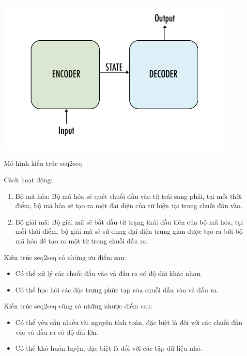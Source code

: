 \begin{minipage}{\linewidth}
    \captionsetup{type=figure}
    \centering
    \includegraphics[width=0.9\textwidth]{images/seq2seq.png}
    \caption{Mô hình kiến trúc seq2seq}
\end{minipage}\par\vfill

Cách hoạt động:

\begin{enumerate}
    \item Bộ mã hóa: Bộ mã hóa sẽ quét chuỗi đầu vào từ trái sang phải, tại mỗi thời điểm, bộ mã hóa sẽ tạo ra một đại diện của từ hiện tại trong chuỗi đầu vào.
    \item Bộ giải mã: Bộ giải mã sẽ bắt đầu từ trạng thái đầu tiên của bộ mã hóa, tại mỗi thời điểm, bộ giải mã sẽ sử dụng đại diện trung gian được tạo ra bởi bộ mã hóa để tạo ra một từ trong chuỗi đầu ra.
\end{enumerate}

Kiến trúc seq2seq có những ưu điểm sau:
\begin{itemize}
    \item Có thể xử lý các chuỗi đầu vào và đầu ra có độ dài khác nhau.
    \item Có thể học hỏi các đặc trưng phức tạp của chuỗi đầu vào và đầu ra.
\end{itemize}

Kiến trúc seq2seq cũng có những nhược điểm sau:
\begin{itemize}
    \item Có thể yêu cầu nhiều tài nguyên tính toán, đặc biệt là đối với các chuỗi đầu vào và đầu ra có độ dài lớn.
    \item Có thể khó huấn luyện, đặc biệt là đối với các tập dữ liệu nhỏ.\cite{seq2seq} 
\end{itemize}

